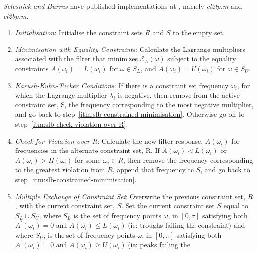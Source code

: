 \documentclass[a4paper,twoside,10pt,english]{report}
\begin{document}
\emph{Selesnick and Burrus} have published implementations
at \cite{Selesnick_cl2lp}, namely \emph{cl2lp.m} and \emph{cl2bp.m}.  

\begin{algorithm}
\begin{enumerate}
\item \label{itm:slb-initialization} \emph{Initialisation}: Initialise the
  constraint sets $R$ and $S$ to the empty set.
\item \label{itm:slb-constrained-minimisation} \emph{Minimisation with Equality
  Constraints}: Calculate the Lagrange multipliers associated with the filter 
  that minimizes $\mathcal{E}_{A}\left(\omega\right)$ subject to the equality 
  constraints $A\left(\omega_{i}\right)=L\left(\omega_{i}\right)$ for 
  $\omega\in S_{L}$, and $A\left(\omega_{i}\right)=U\left(\omega_{i}\right)$ for 
  $\omega\in S_{U}$.
\item \label{itm:slb-KKT-conditions} \emph{Karush-Kuhn-Tucker Conditions}: If
  there is a constraint set frequency $\omega_{i}$, for which the Lagrange
  multiplier $\lambda_{i}$ is negative, then remove from the active constraint
  set, S, the frequency corresponding to the most negative multiplier, and go
  back to step~\ref{itm:slb-constrained-minimisation}. Otherwise go on to 
  step~\ref{itm:slb-check-violation-over-R}.
\item \label{itm:slb-check-violation-over-R} \emph{Check for Violation over R}:
  Calculate the new filter response, $A\left(\omega_{i}\right)$ for frequencies
  in the alternate constraint set, R. If
  $A\left(\omega_{i}\right)<L\left(\omega_{i}\right)$ or
  $A\left(\omega_{i}\right)>H\left(\omega_{i}\right)$ for some
  $\omega_{i}\in R$, then remove the frequency corresponding to the greatest
  violation from $R$, append that frequency to $S$, and go back to 
  step~\ref{itm:slb-constrained-minimisation}.
\item \label{itm:slb-multiple-exchange-of-constraints} \emph{Multiple Exchange
    of Constraint Set}: Overwrite the previous constraint set, $R$, with the
  current constraint set, $S$. Set the current constraint set $S$ equal to
  $S_{L}\cup S_{U}$, where $S_{L}$ is the set of frequency points $\omega$, in
  $\left[0,\pi\right]$ satisfying both $A^{\prime}\left(\omega_{i}\right)=0$ and
  $A\left(\omega_{i}\right)\le L\left(\omega_{i}\right)$ (ie: troughs failing
  the constraint) and where $S_{U}$, is the set of frequency points $\omega$, in
  $\left[0,\pi\right]$ satisfying both $A^{\prime}\left(\omega_{i}\right)=0$ and
  $A\left(\omega_{i}\right)\ge U\left(\omega_{i}\right)$ (ie: peaks failing the

\end{enumerate}
\end{algorithm}
\end{document}
